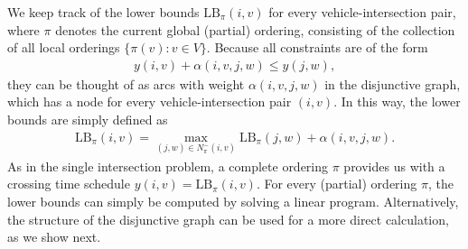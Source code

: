 \documentclass{article}
\theoremstyle{definition}
\theoremstyle{plain}
\begin{document}
We keep track of the lower bounds $\mathrm{LB}_{\pi}(i, v)$ for every
vehicle-intersection pair, where $\pi$ denotes the current global (partial)
ordering, consisting of the collection of all local orderings
$\{ \pi(v) : v \in V \}$.
%
Because all constraints are of the form
\begin{align*}
  y(i, v) + \alpha(i, v, j, w) \leq y(j, w) ,
\end{align*}
they can be thought of as arcs with weight $\alpha(i, v, j, w)$ in the
disjunctive graph, which has a node for every vehicle-intersection pair
$(i, v)$. In this way, the lower bounds are simply defined as
\begin{align*}
  \mathrm{LB}_{\pi}(i, v) = \max_{(j, w) \in N_{\pi}^{-}(i, v)} \mathrm{LB}_{\pi}(j, w) + \alpha(i, v, j, w).
\end{align*}
%
As in the single intersection problem, a complete ordering $\pi$ provides us
with a crossing time schedule $y(i, v) = \mathrm{LB}_{\pi}(i, v)$. For every
(partial) ordering $\pi$, the lower bounds can simply be computed by solving a
linear program. Alternatively, the structure of the disjunctive graph can be
used for a more direct calculation, as we show next.
\end{document}
